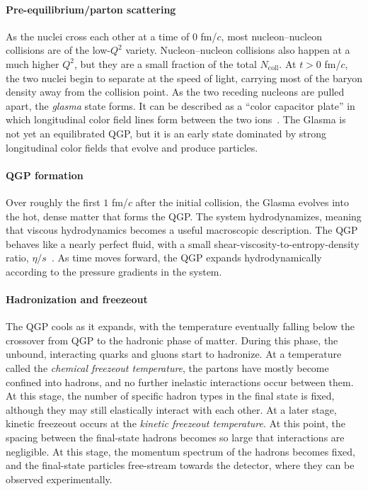 \paragraph{Pre-equilibrium/parton scattering}
As the nuclei cross each other at a time of 0 fm/$c$, most nucleon--nucleon collisions are of the low-$Q^2$ variety.
Nucleon--nucleon collisions also happen at a much higher $Q^2$, but they are a small fraction of the total $N_{\mathrm{coll}}$.
At $t>0$ fm/$c$, the two nuclei begin to separate at the speed of light, carrying most of the baryon density away from the collision point.
As the two receding nucleons are pulled apart, the \textit{glasma} state forms. It can be described as a ``color capacitor plate'' in which longitudinal color field lines form between the two ions~\cite{QGP:Glasma}.
The Glasma is not yet an equilibrated QGP, but it is an early state dominated by strong longitudinal color fields that evolve and produce particles.

\paragraph{QGP formation} Over roughly the first $1$ fm/$c$ after the initial collision, the Glasma evolves into the hot, dense matter that forms the QGP.
The system hydrodynamizes, meaning that viscous hydrodynamics becomes a useful macroscopic description.
The QGP behaves like a nearly perfect fluid, with a small shear-viscosity-to-entropy-density ratio, $\eta/s$~\cite{QGP:Review3}.
As time moves forward, the QGP expands hydrodynamically according to the pressure gradients in the system.

\paragraph{Hadronization and freezeout}
The QGP cools as it expands, with the temperature eventually falling below the crossover from QGP to the hadronic phase of matter.
During this phase, the unbound, interacting quarks and gluons start to hadronize.
At a temperature called the \textit{chemical freezeout temperature}, the partons have mostly become confined into hadrons, and no further inelastic interactions occur between them.
At this stage, the number of specific hadron types in the final state is fixed, although they may still elastically interact with each other.
At a later stage, kinetic freezeout occurs at the \textit{kinetic freezeout temperature}.
At this point, the spacing between the final-state hadrons becomes so large that interactions are negligible.
At this stage, the momentum spectrum of the hadrons becomes fixed, and the final-state particles free-stream towards the detector, where they can be observed experimentally.

